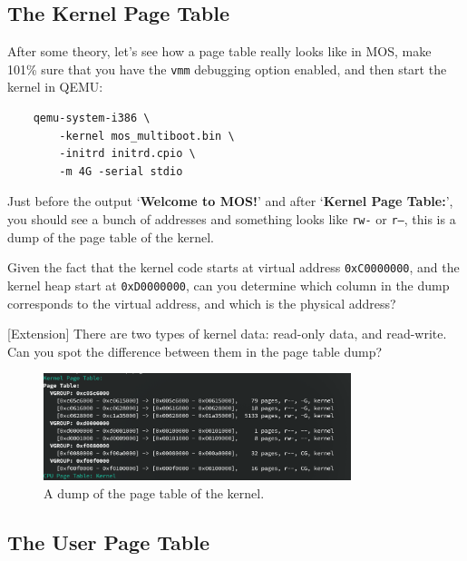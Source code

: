 \subsection{The Kernel Page Table}

After some theory, let's see how a page table really looks like in MOS, make
101\% sure that you have the \texttt{vmm} debugging option enabled, and then start
the kernel in QEMU:

\begin{verbatim}
    qemu-system-i386 \
        -kernel mos_multiboot.bin \
        -initrd initrd.cpio \
        -m 4G -serial stdio
\end{verbatim}

\begin{exercise}
    \item Just before the output `\textbf{Welcome to MOS!}' and after
    `\textbf{Kernel Page Table:}', you should see a bunch of addresses and
    something looks like \texttt{rw-} or \texttt{r--}, this is a dump of the
    page table of the kernel.

    \item Given the fact that the kernel code starts at virtual address
    \texttt{0xC0000000}, and the kernel heap start at \texttt{0xD0000000},
    can you determine which column in the dump corresponds to the virtual
    address, and which is the physical address?

    \item{} [Extension] There are two types of kernel data: read-only data,
    and read-write. Can you spot the difference between them in the page table dump?
\end{exercise}

\begin{figure}[htbp]
    \centering
    \includegraphics[width=0.8\textwidth]{assets/c4.page-table-dump.png}
    \caption{A dump of the page table of the kernel.}
    \label{fig:mm_dump_pagetable}
\end{figure}

\subsection{The User Page Table}

